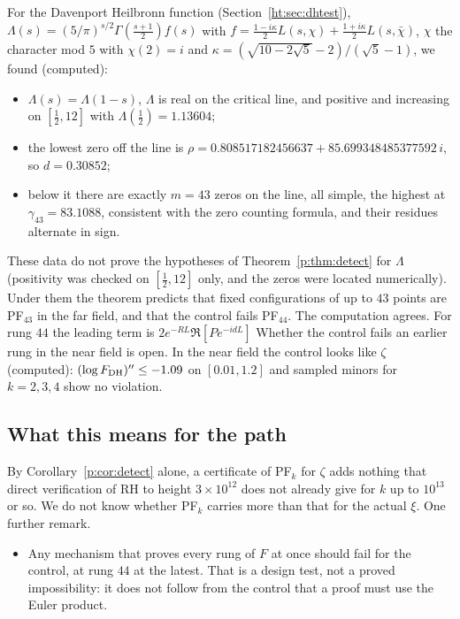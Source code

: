 For the Davenport Heilbronn function (Section~\ref{ht:sec:dhtest}), $\Lambda(s)=(5/\pi)^{s/2}\allowbreak\Gamma(\frac{s+1}2)f(s)$ with $f=\frac{1-i\kappa}2L(s,\chi)+\allowbreak\frac{1+i\kappa}2L(s,\bar\chi)$, $\chi$ the character mod $5$ with $\chi(2)=i$ and $\kappa=\allowbreak(\sqrt{10-2\sqrt5}-2)/(\sqrt5-1)$, we found (computed):
\begin{itemize}
\item $\Lambda(s)=\Lambda(1-s)$, $\Lambda$ is real on the critical line, and positive and increasing on $[\frac12,12]$ with $\Lambda(\frac12)=1.13604$;
\item the lowest zero off the line is $\rho=0.808517182456637+85.699348485377592\,i$, so $d=0.30852$;
\item below it there are exactly $m=43$ zeros on the line, all simple, the highest at $\gamma_{43}=83.1088$, consistent with the zero counting formula, and their residues alternate in sign.
\end{itemize}
These data do not prove the hypotheses of Theorem~\ref{p:thm:detect} for $\Lambda$ (positivity was checked on $[\frac12,12]$ only, and the zeros were located numerically). Under them the theorem predicts that fixed configurations of up to $43$ points are PF$_{43}$ in the far field, and that the control fails PF$_{44}$. The computation agrees. For rung $44$ the leading term is $2e^{-RL}\Re[Pe^{-idL}]$ %
Whether the control fails an earlier rung in the near field is open. In the near field the control looks like $\zeta$ (computed): $(\log F_{\rm DH})''\le-1.09$ on $[0.01,1.2]$ and sampled minors for $k=2,3,4$ show no violation. %

\subsection{What this means for the path}

By Corollary~\ref{p:cor:detect} alone, a certificate of PF$_k$ for $\zeta$ adds nothing that direct verification of RH to height $3\times10^{12}$ does not already give for $k$ up to $10^{13}$ or so. We do not know whether PF$_k$ carries more than that for the actual $\xi$. One further remark.
\begin{itemize}
\item Any mechanism that proves every rung of $F$ at once should fail for the control, at rung $44$ at the latest. That is a design test, not a proved impossibility: it does not follow from the control that a proof must use the Euler product.
\end{itemize}

